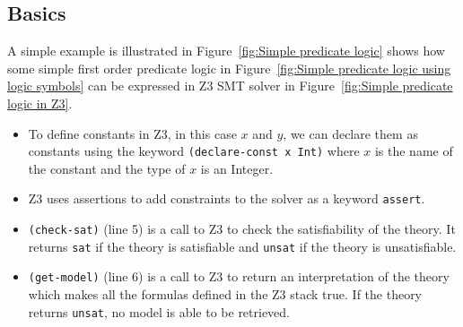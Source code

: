 \documentclass[a4paper]{report}
\begin{document}
\subsection{Basics}
A simple example is illustrated in Figure~\ref{fig:Simple predicate logic} shows how some simple first order predicate logic in Figure~\ref{fig:Simple predicate logic using logic symbols} can be expressed in Z3 SMT solver in  Figure~\ref{fig:Simple predicate logic in Z3}.
\begin{itemize}
\item To define constants in Z3, in this case $x$ and $y$, we can declare them as constants using the keyword \texttt{(declare-const x Int)} where $x$ is the name of the constant and the type of $x$ is an Integer.
\item Z3 uses assertions to add constraints to the solver as a keyword \texttt{assert}. 
\item \texttt{(check-sat)} (line 5) is a call to Z3 to check the satisfiability of the theory. It returns \texttt{sat} if the theory is satisfiable and \texttt{unsat} if the theory is unsatisfiable.
\item \texttt{(get-model)} (line 6) is a call to Z3 to return an interpretation of the theory which makes all the formulas defined in the Z3 stack true. If the theory returns \texttt{unsat}, no model is able to be retrieved.  
\end{itemize}
\end{document}

